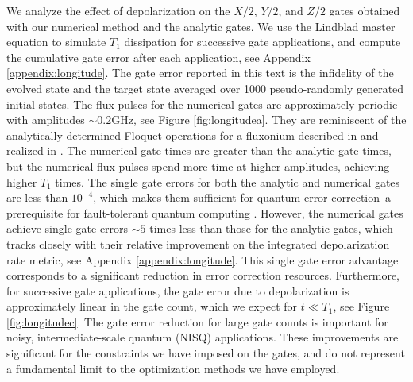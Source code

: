 We analyze the effect of depolarization on
the $X/2$, $Y/2$, and $Z/2$ gates obtained with
our numerical method and the analytic gates. We
use the Lindblad master equation to simulate $T_{1}$ dissipation for successive
gate applications, and compute the cumulative gate error
after each application, see Appendix \ref{appendix:longitude}.
The gate error reported in this text is the infidelity
of the evolved state and the target state averaged over 1000 pseudo-randomly
generated initial states.
The flux pulses for the numerical gates
are approximately periodic
with amplitudes $\sim 0.2 \textrm{GHz}$, see Figure \ref{fig:longitudea}.
They are reminiscent of the analytically determined Floquet operations
for a fluxonium described in \cite{huang2020engineering}
and realized in \cite{mundada2020floquet}.
The numerical gate times are greater
than the analytic gate times, but the
numerical flux pulses
spend more time at higher amplitudes, achieving higher $T_{1}$ times.
The single gate errors for both the analytic and numerical gates are
less than $10^{-4}$, which makes them sufficient for quantum error correction--a
prerequisite for fault-tolerant quantum
computing \cite{aharonov2008fault, knill2005quantum, gottesman1997stabilizer}.
However, the numerical gates achieve single gate errors
$\sim 5$ times less than those for the analytic gates,
which tracks closely with their relative improvement
on the integrated depolarization rate metric, see Appendix \ref{appendix:longitude}.
This single gate error advantage corresponds to a significant reduction in error correction resources.
Furthermore, for successive gate applications, the gate error due to depolarization is approximately linear
in the gate count, which we expect for $t \ll T_{1}$, see Figure \ref{fig:longitudec}.
The gate error reduction for large gate counts is important for noisy, intermediate-scale quantum (NISQ)
applications. These improvements are significant for the constraints we have imposed on the gates,
and do not represent a fundamental limit to the optimization methods we have employed.

